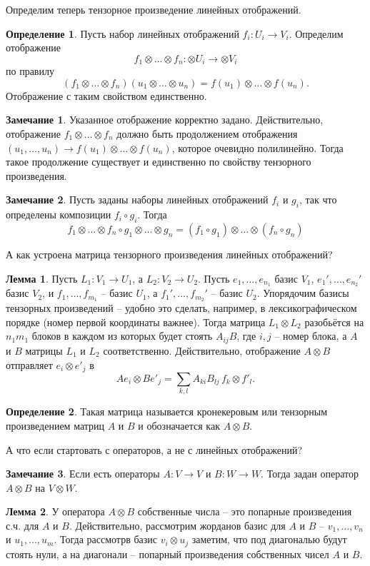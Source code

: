 \documentclass[10pt,a4paper,oneside]{book}
\theoremstyle{definition}
\newtheorem*{rem}{Замечание}
\newtheorem*{defn}{{\color{yellow!30!red} Определение}}
\newtheorem{lem}{{\color{green!50!black} Лемма}}
\def\dfn{\begin{defn}}
\def\edfn{\end{defn}}
\def\lm{\begin{lem}}
\def\elm{\end{lem}}
\def\rm{\begin{rem}}
\def\erm{\end{rem}}
\begin{document}
Определим теперь тензорное произведение линейных отображений.

\dfn Пусть набор линейных отображений $f_i \colon U_i \to V_i$. Определим отображение $$f_1\otimes \dots \otimes f_n \colon \otimes U_i \to \otimes V_i$$ по  правилу $$(f_1\otimes \dots \otimes f_n) (u_1\otimes \dots \otimes u_n) = f(u_1)\otimes \dots \otimes f(u_n).$$
Отображение с таким свойством единственно.
\edfn

\rm Указанное отображение корректно задано. Действительно,  отображение $f_1\otimes \dots \otimes f_n$ должно быть продолжением отображения $(u_1,\dots,u_n) \to f(u_1) \otimes \dots \otimes f(u_n)$, которое очевидно полилинейно. Тогда такое продолжение существует и единственно по свойству тензорного произведения. 
\erm

\rm Пусть заданы наборы линейных отображений $f_i$ и $g_i$, так что определены композиции $f_i\circ g_i$. Тогда $$f_1\otimes \dots \otimes f_n \circ g_1\otimes \dots \otimes g_n=(f_1\circ g_1)\otimes \dots \otimes (f_n\circ g_n)$$
\erm 

А как устроена матрица тензорного произведения линейных отображений?


\lm Пусть $L_1 \colon V_1 \to U_1$, а $L_2 \colon V_2 \to U_2$. Пусть $e_1,\dots, e_{n_1}$ базис $V_1$,  $e_1',\dots, e_{n_2}'$ базис $V_2$,  и $f_1,\dots, f_{m_1}$ -- базис $U_1$, а $f_1',\dots, f_{m_2}'$ -- базис $U_2$. 
Упорядочим базисы тензорных произведений -- удобно это сделать, например, в лексикографическом порядке (номер первой координаты важнее).
Тогда матрица  $L_1\otimes L_2$  разобьётся на $n_1m_1$ блоков в каждом из которых будет стоять $ A_{ij} B$, где $i,j$ -- номер блока, а $A$ и $B$ матрицы $L_1$ и $L_2$ соответственно.
\proof Действительно, отображение $A\otimes B$ отправляет $e_i\otimes e'_j$ в 
$$Ae_i \otimes Be'_j = \sum_{k,l} A_{ki}B_{lj} \, f_k\otimes f'_l.$$
\endproof
\elm

\dfn Такая матрица называется кронекеровым или тензорным произведением матриц $A$ и $B$ и обозначается как $A\otimes B$.
\edfn

А что если стартовать с операторов, а не с линейных отображений?

\rm Если есть операторы $A\colon V \to V$ и $B \colon W \to W$. Тогда задан оператор $A\otimes B$ на $V\otimes W$. \erm

\lm У оператора $A\otimes B$ собственные числа -- это попарные произведения с.ч. для $A$ и $B$. 
\proof Действительно, рассмотрим жорданов базис для $A$ и $B$ -- $v_1,\dots,v_n$ и $u_1,\dots, u_m$. Тогда рассмотрв базис $v_i\otimes u_j$ заметим, что под диагональю будут стоять нули, а на диагонали -- попарный произведения собственных чисел $A$ и $B$.
\endproof
\elm
\end{document}
